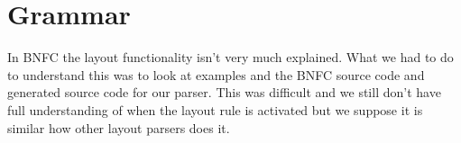 \section{Grammar}


In BNFC the layout functionality isn't very much explained. What we had to do to understand this was to look at examples and the BNFC source code and generated source code for our parser. This was difficult and we still don't have full understanding of when the layout rule is activated but we suppose it is similar how other layout parsers does it. %